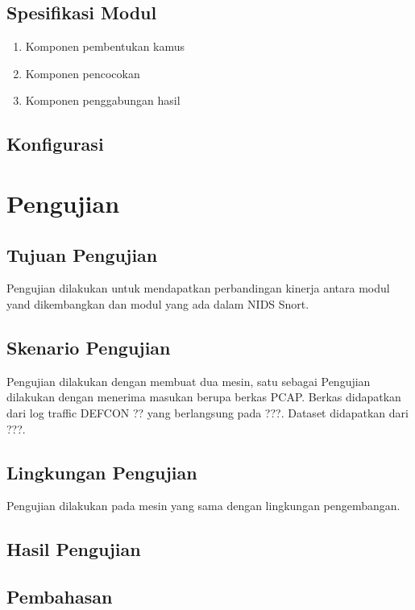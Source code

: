   \subsection{Spesifikasi Modul}
  
   \begin{enumerate}

      \item
      Komponen pembentukan kamus \\
    
      \item
      Komponen pencocokan \\
    
      \item
      Komponen penggabungan hasil \\

    \end{enumerate}

  \subsection{Konfigurasi}
    \blindtext

\section{Pengujian}

  \subsection{Tujuan Pengujian}
    Pengujian dilakukan untuk mendapatkan perbandingan kinerja antara modul yand dikembangkan dan modul yang ada dalam NIDS Snort. 

  \subsection{Skenario Pengujian}
  
    Pengujian dilakukan dengan membuat dua mesin, satu sebagai 
    Pengujian dilakukan dengan menerima masukan berupa berkas PCAP. Berkas didapatkan dari log traffic DEFCON ?? yang berlangsung pada ???. Dataset didapatkan dari ???.
    
  \subsection{Lingkungan Pengujian}
    
    Pengujian dilakukan pada mesin yang sama dengan lingkungan pengembangan.
    
    

  \subsection{Hasil Pengujian}
    \blindtext

  \subsection{Pembahasan}
    \blindtext
